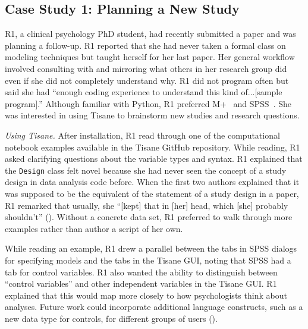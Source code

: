 \subsection{Case Study 1: Planning a New Study}
R1, a clinical psychology PhD student, had recently submitted a paper and was
planning a follow-up.
R1 reported that she had never taken a formal class on modeling techniques but
taught herself for her last paper. Her general workflow involved consulting with
and mirroring what others in her research group did even if she did not
completely understand why. R1 did not program often but said she had ``enough
coding experience to understand this kind of...[sample program].'' Although
familiar with Python, R1 preferred M+~\cite{mplus} and SPSS~\cite{spss}. She was
interested in using Tisane to brainstorm new studies and research questions.

\textit{Using Tisane.} After installation, R1 read through one of the
computational notebook examples available in the Tisane GitHub repository.
While reading, R1 asked clarifying questions about the variable types and
syntax. R1 explained that the \texttt{Design} class felt novel because she had
never seen the concept of a study design in data analysis code before. When the
first two authors explained that it was supposed to be the equivalent of the
statement of a study design in a paper, R1 remarked that usually, she ``[kept]
that in [her] head, which [she] probably shouldn't'' (\rqCognitive). Without
a concrete data set, R1 preferred to walk through more examples %
rather than author a script of her own.

While reading an example, R1 drew a parallel between the tabs in SPSS dialogs for specifying models and
the tabs in the Tisane GUI, noting that SPSS had a tab for control variables.
R1 also wanted the ability to distinguish between ``control
variables'' and other independent variables in the Tisane GUI. R1 explained that this
would map more closely to how psychologists think about analyses.
Future work could incorporate additional language constructs, such as
a new data type for controls, for different groups of users (\rqFuture).

